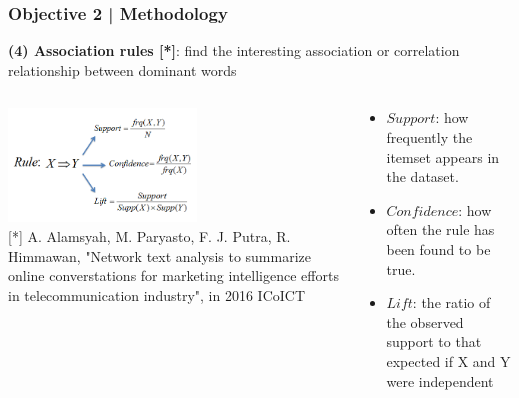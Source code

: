 \documentclass{beamer}
\begin{document}
\begin{frame}
\frametitle{Objective 2 | Methodology}
\textbf{(4) Association rules [*]}: find the interesting association or correlation relationship between dominant words \\


\begin{columns}
	\begin{column}{.55\textwidth}
		\includegraphics[width=50mm]{AR_1.png}\\
{\tiny 	[*] A. Alamsyah, M. Paryasto, F. J. Putra, R. Himmawan, "Network text analysis to summarize online converstations for marketing intelligence efforts in telecommunication industry", in 2016 ICoICT}
	\end{column}
	\begin{column}{.55\textwidth}
	\begin{itemize}
		\item $Support$: how frequently the itemset appears in the dataset.
		
		
		\item $Confidence$: how often the rule has been found to be true.
		
		
		\item $Lift$: the ratio of the observed support to that expected if X and Y were independent
		
	\end{itemize}

	\end{column}
\end{columns}


\end{frame}
\end{document}
